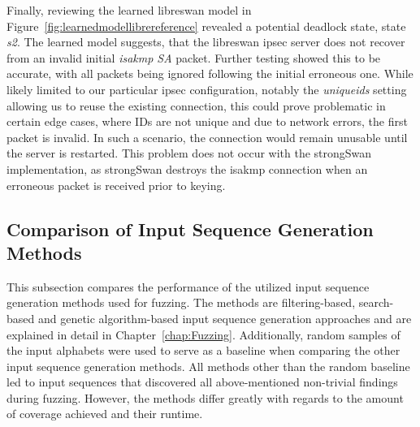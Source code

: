 Finally, reviewing the learned libreswan model in Figure~\ref{fig:learnedmodellibrereference} revealed a potential deadlock state, state \emph{s2}. The learned model suggests, that the libreswan \ac{ipsec} server does not recover from an invalid initial \emph{\ac{isakmp} SA} packet. Further testing showed this to be accurate, with all packets being ignored following the initial erroneous one. While likely limited to our particular \ac{ipsec} configuration, notably the \emph{uniqueids} setting allowing us to reuse the existing connection, this could prove problematic in certain edge cases, where IDs are not unique and due to network errors, the first packet is invalid. In such a scenario, the connection would remain unusable until the server is restarted. This problem does not occur with the strongSwan implementation, as strongSwan destroys the \ac{isakmp} connection when an erroneous packet is received prior to keying.


\subsection{Comparison of Input Sequence Generation Methods} \label{subsec:mutation_vs_filtering}
This subsection compares the performance of the utilized input sequence generation methods used for fuzzing. The methods are filtering-based, search-based and genetic algorithm-based input sequence generation approaches and are explained in detail in Chapter~\ref{chap:Fuzzing}. Additionally, random samples of the input alphabets were used to serve as a baseline when comparing the other input sequence generation methods. All methods other than the random baseline led to input sequences that discovered all above-mentioned non-trivial findings during fuzzing. However, the methods differ greatly with regards to the amount of coverage achieved and their runtime.

